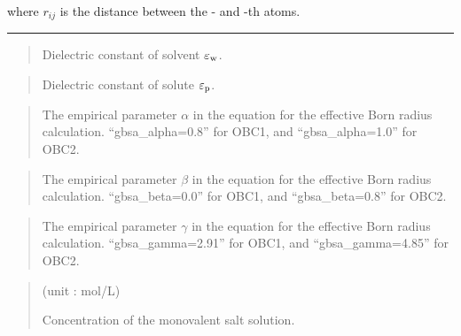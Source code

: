 \documentclass[a4paper,11pt,oneside,english]{sphinxmanual}
\begin{document}
where \(r_{ij}\) is the distance between the - and -th atoms.


\bigskip\hrule\bigskip


 
\begin{quote}


Dielectric constant of solvent \(\varepsilon_{{\rm{w}}}\).
\end{quote}

 
\begin{quote}


Dielectric constant of solute \(\varepsilon_{{\rm{p}}}\).
\end{quote}

 
\begin{quote}


The empirical parameter \(\alpha\) in the equation for the effective Born radius calculation.
“gbsa\_alpha=0.8” for OBC1, and “gbsa\_alpha=1.0” for OBC2.
\end{quote}

 
\begin{quote}


The empirical parameter \(\beta\) in the equation for the effective Born radius calculation.
“gbsa\_beta=0.0” for OBC1, and “gbsa\_beta=0.8” for OBC2.
\end{quote}

 
\begin{quote}


The empirical parameter \(\gamma\) in the equation for the effective Born radius calculation.
“gbsa\_gamma=2.91” for OBC1, and “gbsa\_gamma=4.85” for OBC2.
\end{quote}

 
\begin{quote}

 (unit : mol/L)

Concentration of the monovalent salt solution.
\end{quote}
\end{document}
